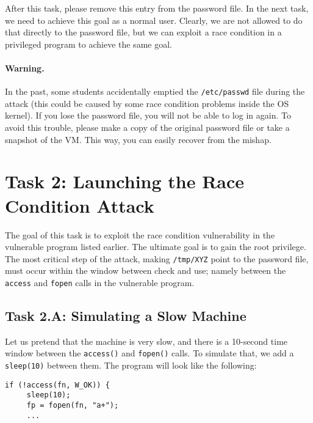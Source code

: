 After this task, please remove this entry from the password file. In the
next task, we need to achieve this goal as a normal user. Clearly, we are
not allowed to do that directly to the password file, but we can exploit a
race condition in a privileged program to achieve the same goal.


\paragraph{Warning.}
In the past, some students accidentally emptied the {\tt /etc/passwd} file 
during the attack (this could be caused by some race condition problems
inside the OS kernel). If you lose
the password file, you will not be able to log in again. To avoid this 
trouble, please make a copy of the original password file or take a
snapshot of the VM. This way, you can easily recover from the mishap. 



\section{Task 2: Launching the Race Condition Attack}

The goal of this task is to exploit the race condition vulnerability in 
the vulnerable \setuid program listed earlier. The ultimate goal is to gain
the root privilege.  The most critical step of the attack,  making
\texttt{/tmp/XYZ} point to the password file, must occur within
the window between check and use; namely between the \texttt{access} 
and \texttt{fopen} calls in the vulnerable program. 

\subsection{Task 2.A: Simulating a Slow Machine} 

Let us pretend that the machine is very slow, and there is a 10-second time window between
the \texttt{access()} and \texttt{fopen()} calls. To simulate that, we 
add a \texttt{sleep(10)} between them. The program will look like the following:

\begin{lstlisting}
if (!access(fn, W_OK)) {
     sleep(10);
     fp = fopen(fn, "a+");
     ...
\end{lstlisting}
 
